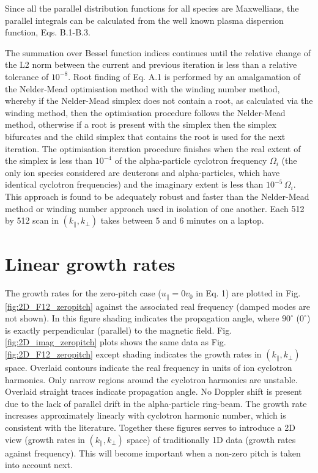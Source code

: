 \documentclass[12pt]{iopart}
\begin{document}
Since all the parallel distribution functions for all species are Maxwellians, the parallel integrals can be calculated from the well known plasma dispersion function\cite{Fried1961}, Eqs. B.1-B.3.

The summation over Bessel function indices continues until the relative change of the L2 norm between the current and previous iteration is less than a relative tolerance of $10^{-8}$. Root finding of Eq. A.1 is performed by an amalgamation of the Nelder-Mead\cite{Nelder1965} optimisation method with the winding number method, whereby if the Nelder-Mead simplex does not contain a root, as calculated via the winding method, then the optimisation procedure follows the Nelder-Mead method, otherwise if a root is present with the simplex then the simplex bifurcates and the child simplex that contains the root is used for the next iteration. The optimisation iteration procedure finishes when the real extent of the simplex is less than $10^{-4}$ of the alpha-particle cyclotron frequency $\Omega_i$ (the only ion species considered are deuterons and alpha-particles, which have identical cyclotron frequencies) and the imaginary extent is less than $10^{-5}\,\Omega_i$. This approach is found to be adequately robust and faster than the Nelder-Mead method or winding number approach used in isolation of one another. Each 512 by 512 scan in $(k_\parallel, k_\perp)$ takes between 5 and 6 minutes on a laptop.

\section{Linear growth rates}

The growth rates for the zero-pitch case ($u_\parallel = 0 v_0$ in Eq. 1) are plotted in Fig. \ref{fig:2D_F12_zeropitch} against the associated real frequency (damped modes are not shown). In this figure shading indicates the propagation angle, where $90^\circ$ ($0^\circ$) is exactly perpendicular (parallel) to the magnetic field. Fig. \ref{fig:2D_imag_zeropitch} plots shows the same data as Fig. \ref{fig:2D_F12_zeropitch} except shading indicates the growth rates in $(k_\parallel, k_\perp)$ space. Overlaid contours indicate the real frequency in units of ion cyclotron harmonics. Only narrow regions around the cyclotron harmonics are unstable. Overlaid straight traces indicate propagation angle. No Doppler shift is present due to the lack of parallel drift in the alpha-particle ring-beam. The growth rate increases approximately linearly with cyclotron harmonic number, which is consistent with the literature\cite{Dendy1994}. Together these figures serves to introduce a 2D view (growth rates in $(k_\parallel, k_\perp)$ space) of traditionally 1D data (growth rates against frequency). This will become important when a non-zero pitch is taken into account next.
\end{document}
